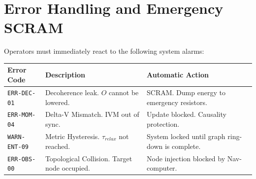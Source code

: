 \documentclass[12pt,a4paper]{article}
\begin{document}
\section{Error Handling and Emergency SCRAM}
Operators must immediately react to the following system alarms:

\begin{table}[h!]
\centering
\begin{tabular}{@{}p{3.5cm}p{6cm}p{5cm}@{}}
\toprule
\textbf{Error Code} & \textbf{Description} & \textbf{Automatic Action} \\ \midrule
\texttt{ERR-DEC-01} & Decoherence leak. $O$ cannot be lowered. & SCRAM. Dump energy to emergency resistors. \\
\texttt{ERR-MOM-04} & Delta-V Mismatch. IVM out of sync. & Update blocked. Causality protection. \\
\texttt{WARN-ENT-09} & Metric Hysteresis. $\tau_{relax}$ not reached. & System locked until graph ring-down is complete. \\
\texttt{ERR-OBS-00} & Topological Collision. Target node occupied. & Node injection blocked by Nav-computer. \\ \bottomrule
\end{tabular}
\end{table}
\end{document}
